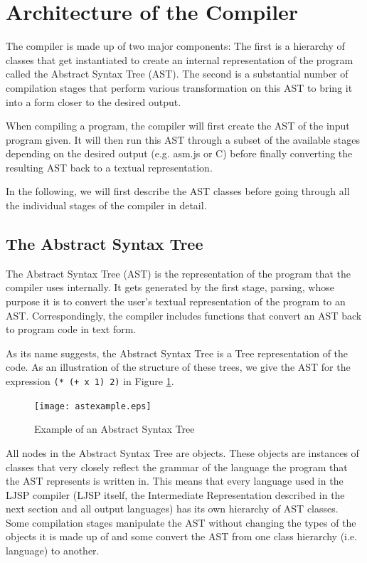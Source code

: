 \documentclass[11pt]{report}
\begin{document}
\section{Architecture of the Compiler}
The compiler is made up of two major components: The first is a hierarchy of classes that get instantiated to create an internal representation of the program called the Abstract Syntax Tree (AST). The second is a substantial number of compilation stages that perform various transformation on this AST to bring it into a form closer to the desired output.

When compiling a program, the compiler will first create the AST of the input program given. It will then run this AST through a subset of the available stages depending on the desired output (e.g. asm.js or C) before finally converting the resulting AST back to a textual representation.

In the following, we will first describe the AST classes before going through all the individual stages of the compiler in detail.

\subsection{The Abstract Syntax Tree}
The Abstract Syntax Tree (AST) is the representation of the program that the compiler uses internally. It gets generated by the first stage, parsing, whose purpose it is to convert the user's textual representation of the program to an AST. Correspondingly, the compiler includes functions that convert an AST back to program code in text form.

As its name suggests, the Abstract Syntax Tree is a Tree representation of the code. As an illustration of the structure of these trees, we give the AST for the expression \hbox{\texttt{(* (+ x 1) 2)}} in Figure \ref{astexample}.

\begin{figure}[ht]
\begin{center}
\texttt{[image: astexample.eps]}
\end{center}
\caption{Example of an Abstract Syntax Tree}
\label{astexample}
\end{figure}

All nodes in the Abstract Syntax Tree are objects. These objects are instances of classes that very closely reflect the grammar of the language the program that the AST represents is written in. This means that every language used in the LJSP compiler (LJSP itself, the Intermediate Representation described in the next section and all output languages) has its own hierarchy of AST classes. Some compilation stages manipulate the AST without changing the types of the objects it is made up of and some convert the AST from one class hierarchy (i.e. language) to another. 
\end{document}

